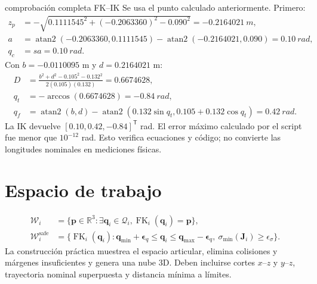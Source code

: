 \documentclass[11pt,letterpaper]{article}
\newcommand{\vect}[1]{\bm{#1}}
\newcommand{\mat}[1]{\bm{#1}}
\newcommand{\R}{\mathbb{R}}
\newcommand{\trans}{^{\mathsf T}}
\newcommand{\FK}{\operatorname{FK}}
\begin{document}
\begin{workedexample}{comprobación completa FK--IK}
Se usa el punto calculado anteriormente. Primero:
\begin{align*}
 z_p&=-\sqrt{0.1111545^2+(-0.2063360)^2-0.090^2}
      =\SI{-0.2164021}{m},\\
 a&=\operatorname{atan2}(-0.2063360,0.1111545)
 -\operatorname{atan2}(-0.2164021,0.090)=\SI{0.10}{rad},\\
 q_c&=s a=\SI{0.10}{rad}.
\end{align*}
Con $b=-0.0110095$ m y $d=0.2164021$ m:
\begin{align*}
 D&=\frac{b^2+d^2-0.105^2-0.132^2}{2(0.105)(0.132)}
 =0.6674628,\\
 q_t&=-\arccos(0.6674628)=\SI{-0.84}{rad},\\
 q_f&=\operatorname{atan2}(b,d)-\operatorname{atan2}(0.132\sin q_t,
 0.105+0.132\cos q_t)=\SI{0.42}{rad}.
\end{align*}
La IK devuelve $[0.10,0.42,-0.84]\trans$ rad. El error máximo calculado por
el script fue menor que $10^{-12}$ rad. Esto verifica ecuaciones y código; no
convierte las longitudes nominales en mediciones físicas.
\end{workedexample}

\section{Espacio de trabajo}
\begin{align}
 \mathcal W_i&=\{\vect p\in\R^3:\exists\vect q_i\in\mathcal Q_i,
 \FK_i(\vect q_i)=\vect p\},\label{eq:workspace}\\
 \mathcal W_i^{\mathrm{safe}}&=\{\FK_i(\vect q_i):
 \vect q_{\min}+\vect\epsilon_q\le\vect q_i\le
 \vect q_{\max}-\vect\epsilon_q,\ \sigma_{\min}(\mat J_i)\ge\epsilon_\sigma\}.
\end{align}
La construcción práctica muestrea el espacio articular, elimina colisiones y
márgenes insuficientes y genera una nube 3D. Deben incluirse cortes $x$--$z$ y
$y$--$z$, trayectoria nominal superpuesta y distancia mínima a límites.
\end{document}
